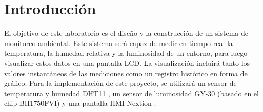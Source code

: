 \section{Introducción}
El objetivo de este laboratorio es el diseño y la construcción de un sistema de monitoreo ambiental. Este sistema será capaz de medir en tiempo real la temperatura, la humedad relativa y la luminosidad de un entorno, para luego visualizar estos datos en una pantalla LCD. La visualización incluirá tanto los valores instantáneos de las mediciones como un registro histórico en forma de gráfico. Para la implementación de este proyecto, se utilizará un sensor de temperatura y humedad DHT11 \cite{dht11}, un sensor de luminosidad GY-30 (basado en el chip BH1750FVI) \cite{gy30} y una pantalla HMI Nextion \cite{nextion}.

